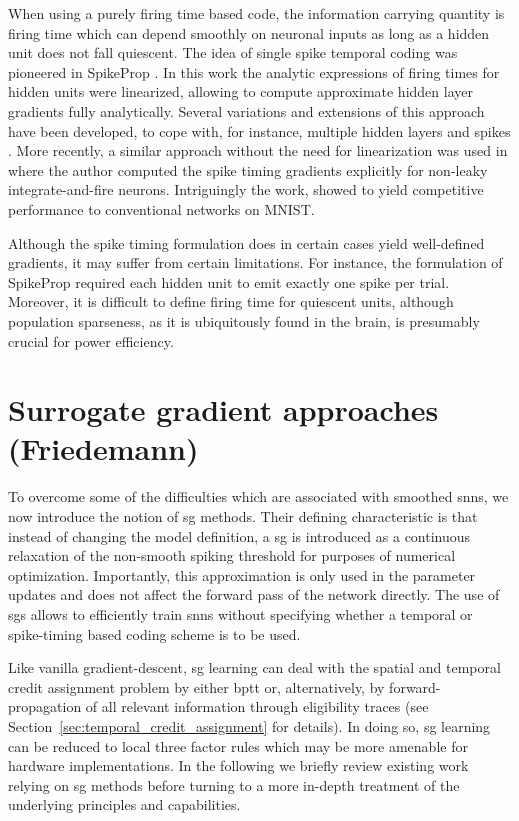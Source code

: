 \documentclass[journal,onecolumn,11pt]{IEEEtran}
\begin{document}
When using a purely firing time based code, the information carrying quantity is
firing time which can depend smoothly on neuronal inputs as long as a hidden
unit does not fall quiescent.
The idea of single spike temporal coding was 
pioneered in SpikeProp \cite{bohte_error-backpropagation_2002}.
In this work the analytic expressions of firing times for hidden units 
were linearized, allowing to compute approximate hidden layer gradients fully
analytically. 
Several variations and extensions of this approach have been developed,
to cope with, for instance, multiple hidden layers and spikes
\cite{banerjee_learning_2016}. %
More recently, a similar approach without the need for linearization 
was used in \cite{Mostafa16_supelear} where the author computed the spike timing 
gradients explicitly for non-leaky integrate-and-fire neurons. 
Intriguingly the work, showed to yield competitive performance to conventional
networks on MNIST.

Although the spike timing formulation does in certain cases
yield well-defined gradients, it may suffer from certain
limitations. 
For instance, the formulation of SpikeProp required each hidden
unit to emit exactly one spike per trial. Moreover, it is difficult to define 
firing time for quiescent units, although population sparseness, as it is
ubiquitously found in the brain, is presumably crucial for power
efficiency.


\section{Surrogate gradient approaches (Friedemann)}

To overcome some of the difficulties which are associated with 
smoothed \glspl{snn}, we now introduce the notion of \gls{sg} methods.
Their defining characteristic is that
instead of changing the model definition,
a \gls{sg} is introduced as a continuous relaxation of the non-smooth
spiking threshold for purposes of numerical optimization.
Importantly, this approximation is only used in the parameter updates and does
not affect the forward pass of the network directly.
The use of \glspl{sg} allows to efficiently train \glspl{snn} without specifying whether a temporal or spike-timing based coding scheme is to be used. 

Like vanilla gradient-descent, \gls{sg} learning can deal with the spatial and
temporal credit assignment problem by either \gls{bptt} or,
alternatively, by forward-propagation of all relevant information through
eligibility traces (see Section~\ref{sec:temporal_credit_assignment} for details). 
In doing so, \gls{sg} learning can be reduced to local three factor rules which
may be more amenable for hardware implementations. 
In the following we briefly review existing work relying on \gls{sg} methods
before turning to a more in-depth treatment of the underlying principles and
capabilities. 
\end{document}
